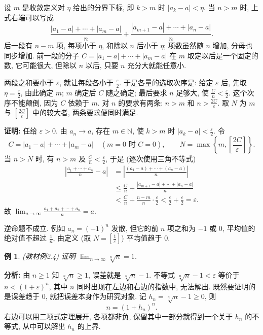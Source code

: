 \documentclass[UTF8,openany]{ctexbook}
\theoremstyle{chinesetextbook}
\newtheorem{example}{例}[section]
\newenvironment{cnproof}{\par\indent\textbf{证明:} \ignorespaces}{\par}
\begin{document}
设 $m$ 是收敛定义对 $\eta$ 给出的分界下标, 即 $k>m$ 时 $|a_k-a|<\eta$. 当 $n>m$ 时, 上式右端可以写成
\[
\frac{|a_1-a|+\cdots+|a_m-a|}n+\frac{|a_{m+1}-a|+\cdots+|a_n-a|}n.
\]
后一段有 $n-m$ 项, 每项小于 $\eta$, 和除以 $n$ 后小于 $\eta$; 项数虽然随 $n$ 增加, 分母也同步增加. 前一段的分子 $C=|a_1-a|+\cdots+|a_m-a|$ 在 $m$ 取定以后是一个固定的数, 它可能很大, 但除以 $n$ 以后, 只要 $n$ 充分大就能任意小.

两段之和要小于 $\varepsilon$, 就让每段各小于 $\displaystyle\frac\varepsilon2$. 于是各量的选取次序是: 给定 $\varepsilon$ 后, 先取 $\displaystyle\eta=\frac\varepsilon2$, 由此确定 $m$; $m$ 确定后 $C$ 随之确定; 最后要求 $n$ 足够大, 使 $\displaystyle\frac Cn<\frac\varepsilon2$. 这个次序不能颠倒, 因为 $C$ 依赖于 $m$. 对 $n$ 的要求有两条: $n>m$ 和 $\displaystyle n>\frac{2C}\varepsilon$. 取 $N$ 为 $m$ 与 $\displaystyle\left[\frac{2C}\varepsilon\right]$ 中的较大者, 两条要求便同时满足.
\begin{cnproof}
任给 $\varepsilon>0$. 由 $a_n\to a$, 存在 $m\in\mathbb N$, 使 $k>m$ 时 $\displaystyle|a_k-a|<\frac\varepsilon2$. 令
\[
C=|a_1-a|+\cdots+|a_m-a|\quad(m=0\text{ 时 }C=0),\qquad N=\max\left\{m,\left[\frac{2C}\varepsilon\right]\right\}.
\]
当 $n>N$ 时, 有 $n>m$ 及 $\displaystyle\frac Cn<\frac\varepsilon2$, 于是 (逐次使用三角不等式)
\[
\begin{aligned}
\left|\frac{a_1+\cdots+a_n}n-a\right|
&=\left|\frac{(a_1-a)+\cdots+(a_n-a)}n\right|\\
&\le\frac Cn+\frac{|a_{m+1}-a|+\cdots+|a_n-a|}n\\
&<\frac Cn+\frac{n-m}n\cdot\frac\varepsilon2
<\frac\varepsilon2+\frac\varepsilon2=\varepsilon.
\end{aligned}
\]
故 $\displaystyle\lim_{n\to\infty}\frac{a_1+a_2+\cdots+a_n}n=a$.
\end{cnproof}
逆命题不成立. 例如 $a_n=(-1)^n$ 发散, 但它的前 $n$ 项之和为 $-1$ 或 $0$, 平均值的绝对值不超过 $\displaystyle\frac1n$, 由定义 (取 $\displaystyle N=\left[\frac1\varepsilon\right]$) 平均值趋于 $0$.
\begin{example}
\textnormal{(教材例2.4)} 证明 $\displaystyle\lim_{n\to\infty}\sqrt[n]n=1$.
\end{example}
\par\indent\textbf{分析:} 由 $n\ge1$ 知 $\sqrt[n]n\ge1$, 误差就是 $\sqrt[n]n-1$. 不等式 $\sqrt[n]n-1<\varepsilon$ 等价于 $n<(1+\varepsilon)^n$, 其中 $n$ 同时出现在左边和右边的指数中, 无法解出. 既然要证明的是误差趋于 $0$, 就把误差本身作为研究对象. 记 $h_n=\sqrt[n]n-1\ge0$, 则
\[
n=(1+h_n)^n.
\]
右边可以用二项式定理展开, 各项都非负, 保留其中一部分就得到一个关于 $h_n$ 的不等式, 从中可以解出 $h_n$ 的上界.
\end{document}
